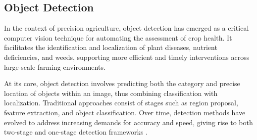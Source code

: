 

\subsection{Object Detection}
In the context of precision agriculture, object detection has emerged as a critical computer vision technique for automating the assessment of crop health. It facilitates the identification and localization of plant diseases, nutrient deficiencies, and weeds, supporting more efficient and timely interventions across large-scale farming environments. 

At its core, object detection involves predicting both the category and precise location of objects within an image, thus combining classification with localization. Traditional approaches consist of stages such as region proposal, feature extraction, and object classification. Over time, detection methods have evolved to address increasing demands for accuracy and speed, giving rise to both two-stage and one-stage detection frameworks \parencite{zhao2019objectdetection}.

